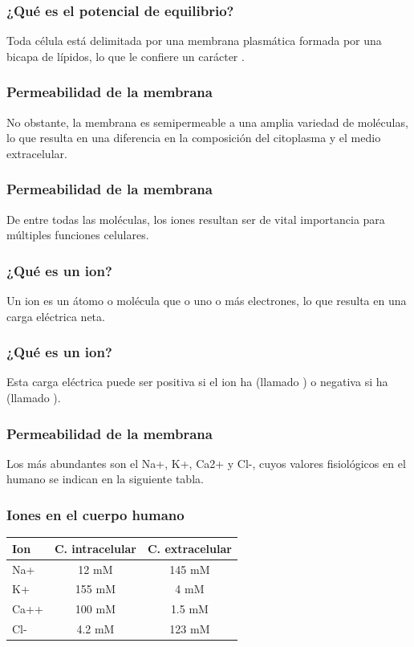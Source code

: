 \documentclass[14pt]{beamer}
\begin{document}
\begin{frame}
\frametitle{¿Qué es el potencial de equilibrio?}
Toda célula está delimitada por una membrana plasmática formada por una bicapa de lípidos, lo que le confiere un carácter .
\end{frame}
\begin{frame}
\frametitle{Permeabilidad de la membrana}
No obstante, la membrana es semipermeable a una amplia variedad de moléculas, \pause lo que resulta en una diferencia en la composición del citoplasma y el medio extracelular.
\end{frame}
\begin{frame}
\frametitle{Permeabilidad de la membrana}
De entre todas las moléculas, \pause los iones resultan ser de vital importancia para múltiples funciones celulares.
\end{frame}
\begin{frame}
\frametitle{¿Qué es un ion?}
Un ion es un átomo o molécula que  o  uno o más electrones, lo que resulta en una carga eléctrica neta.
\end{frame}
\begin{frame}
\frametitle{¿Qué es un ion?}
Esta carga eléctrica puede ser positiva si el ion ha  (llamado ) \pause o negativa si ha  (llamado ).
\end{frame}
\begin{frame}
\frametitle{Permeabilidad de la membrana}
Los más abundantes son el Na+, K+, Ca2+ y Cl-, cuyos valores fisiológicos en el humano se indican en la siguiente tabla.
\end{frame}
\begin{frame}
\frametitle{Iones en el cuerpo humano}
\vspace*{-0.5cm}
\begin{table}
    \centering
    \begin{tabular}{l | c | c}
    Ion & C. intracelular & C. extracelular \\ \hline
    Na+ & 12 mM & 145 mM \\ \hline
    K+ & 155 mM & 4 mM \\ \hline
    Ca++ & 100 mM & 1.5 mM \\ \hline
    Cl- & 4.2 mM & 123 mM \\ \hline
\end{tabular}
\end{table}
\end{frame}
\end{document}
